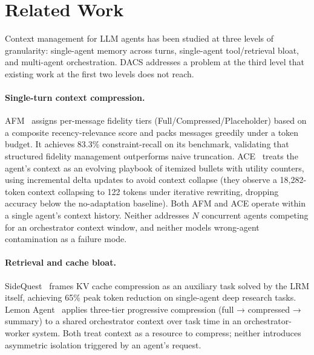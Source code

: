 \documentclass{article}
\begin{document}
\section{Related Work}
\label{sec:related}

Context management for LLM agents has been studied at three levels of
granularity: single-agent memory across turns, single-agent tool/retrieval
bloat, and multi-agent orchestration.
DACS addresses a problem at the third level that existing work at the
first two levels does not reach.

\paragraph{Single-turn context compression.}
\begin{sloppypar}
AFM~\citep{afm2024} assigns per-message fidelity tiers
(Full/Compressed/Placeholder) based on a composite recency-relevance score
and packs messages greedily under a token budget.
It achieves 83.3\% constraint-recall on its benchmark, validating that
structured fidelity management outperforms naive truncation.
ACE~\citep{ace2026} treats the agent's context as an evolving playbook
of itemized bullets with utility counters, using incremental delta updates
to avoid context collapse (they observe a 18{,}282-token context collapsing
to 122 tokens under iterative rewriting, dropping accuracy below the
no-adaptation baseline).
Both AFM and ACE operate within a single agent's context history.
Neither addresses $N$ concurrent agents competing for an orchestrator
context window, and neither models wrong-agent contamination as a failure
mode.
\end{sloppypar}

\paragraph{Retrieval and cache bloat.}
SideQuest~\citep{sidequest2025} frames KV cache compression as an
auxiliary task solved by the LRM itself, achieving 65\% peak token
reduction on single-agent deep research tasks.
Lemon Agent~\citep{lemon2025} applies three-tier progressive compression
(full → compressed → summary) to a shared orchestrator context over task
time in an orchestrator-worker system.
Both treat context as a resource to compress; neither introduces asymmetric
isolation triggered by an agent's request.
\end{document}
